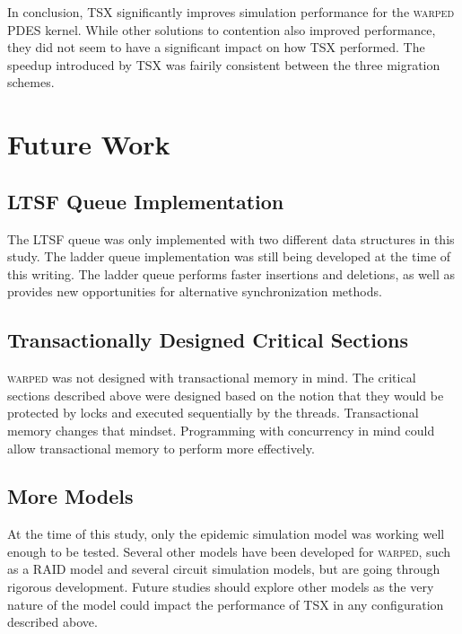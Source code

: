 \documentclass[11pt]{book}
\begin{document}
In conclusion, TSX significantly improves simulation performance for the \textsc{warped}
PDES kernel.  While other solutions to contention also improved performance, they did not
seem to have a significant impact on how TSX performed.  The speedup introduced by TSX was
fairily consistent between the three migration schemes.

\section{Future Work}

\subsection{LTSF Queue Implementation}

The LTSF queue was only implemented with two different data structures in this study.  The
ladder queue implementation was still being developed at the time of this writing.  The
ladder queue performs faster insertions and deletions, as well as provides new
opportunities for alternative synchronization methods.

\subsection{Transactionally Designed Critical Sections}

\textsc{warped} was not designed with transactional memory in mind.  The critical sections
described above were designed based on the notion that they would be protected by locks
and executed sequentially by the threads.  Transactional memory changes that mindset.
Programming with concurrency in mind could allow transactional memory to perform more
effectively.

\subsection{More Models}

At the time of this study, only the epidemic simulation model was working well enough to
be tested.  Several other models have been developed for \textsc{warped}, such as a RAID
model and several circuit simulation models, but are going through rigorous development.
Future studies should explore other models as the very nature of the model could impact
the performance of TSX in any configuration described above.

\newpage


\end{document}
